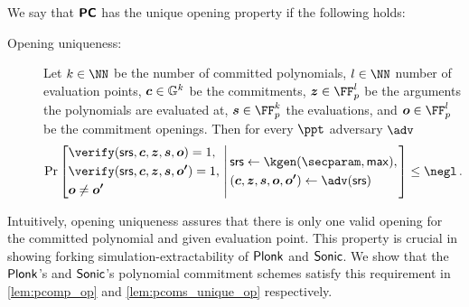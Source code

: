 \documentclass[runningheads,11pt]{llncs}
\let\spvec\vec
\let\vec\accentvec
\let\spvec\vec
\let\vec\spvec
\def\vec#1{\mathchoice{\mbox{\boldmath$\displaystyle#1$}}
  {\mbox{\boldmath$\textstyle#1$}} {\mbox{\boldmath$\scriptstyle#1$}}
  {\mbox{\boldmath$\scriptscriptstyle#1$}}}
\begin{document}
We say that $\bm{\mathsf{PC}}$ has the unique opening property if the following holds:
\begin{description}
\item[Opening uniqueness:] Let $k \in \NN$ be the number of committed
  polynomials, $l \in \NN$ number of evaluation points, $\vec{c} \in \GRP^k$ be
  the commitments, $\vec{z} \in \FF_p^l$ be the arguments the polynomials are
  evaluated at, $\vec{s} \in \FF_p^k$ the evaluations, and $\vec{o} \in \FF_p^l$
  be the commitment openings. Then for every $\ppt$ adversary $\adv$
	\[
		\Pr
			\left[
			\begin{aligned}
				& \verify(\srs, \vec{c}, \vec{z}, \vec{s}, \vec{o}) = 1,  \\ 
				& \verify(\srs, \vec{c}, \vec{z}, \vec{s}, \vec{o'}) = 1, \\
				& \vec{o} \neq \vec{o'}
			\end{aligned}
			\,\left|\, \vphantom{\begin{aligned}
                  & \\
                  & \\
                  &
                \end{aligned}}
			\begin{aligned}
				& \srs \gets \kgen(\secparam, \maxdeg),\\
				& (\vec{c}, \vec{z}, \vec{s}, \vec{o}, \vec{o'}) \gets \adv(\srs)
			\end{aligned}
			\right.\right] \leq \negl\,.
	\]
\end{description}
Intuitively, opening uniqueness assures that there is only one valid opening
for the committed polynomial and given evaluation point. This property is
crucial in showing forking simulation-extractability of $\textnormal{\textsf{Plonk}}$ and ${\textnormal{\textsf{Sonic}}}$. We show
that the $\textnormal{\textsf{Plonk}}$'s and ${\textnormal{\textsf{Sonic}}}$'s polynomial commitment schemes satisfy this
requirement in \cref{lem:pcomp_op} and \cref{lem:pcoms_unique_op}
respectively.
\end{document}
